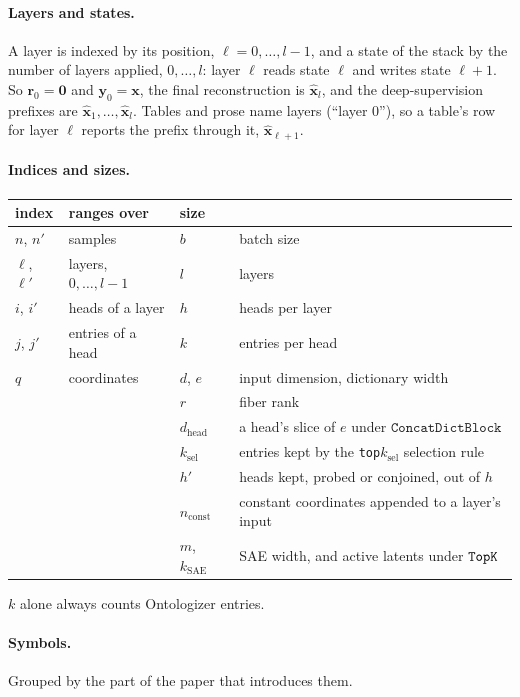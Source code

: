 \paragraph{Layers and states.}
A layer is indexed by its position, $\ell = 0,\dots,l-1$, and a state of
the stack by the number of layers applied, $0,\dots,l$: layer $\ell$
reads state $\ell$ and writes state $\ell+1$. So $\mathbf{r}_0 =
\mathbf{0}$ and $\mathbf{y}_0 = \mathbf{x}$, the final reconstruction is
$\hat{\mathbf{x}}_l$, and the deep-supervision prefixes are
$\hat{\mathbf{x}}_1,\dots,\hat{\mathbf{x}}_l$. Tables and prose name
layers (``layer 0''), so a table's row for layer $\ell$ reports the prefix
through it, $\hat{\mathbf{x}}_{\ell+1}$.

\paragraph{Indices and sizes.}
\begin{center}\small
\begin{tabular}{@{}llll@{}}
\toprule
index & ranges over & size & \\
\midrule
$n$, $n'$ & samples & $b$ & batch size \\
$\ell$, $\ell'$ & layers, $0,\dots,l-1$ & $l$ & layers \\
$i$, $i'$ & heads of a layer & $h$ & heads per layer \\
$j$, $j'$ & entries of a head & $k$ & entries per head \\
$q$ & coordinates & $d$, $e$ & input dimension, dictionary width \\
\midrule
& & $r$ & fiber rank \\
& & $d_{\mathrm{head}}$ & a head's slice of $e$ under $\mathtt{ConcatDictBlock}$ \\
& & $k_{\mathrm{sel}}$ & entries kept by the \texttt{top}$k_{\mathrm{sel}}$ selection rule \\
& & $h'$ & heads kept, probed or conjoined, out of $h$ \\
& & $n_{\mathrm{const}}$ & constant coordinates appended to a layer's input \\
& & $m$, $k_{\mathrm{SAE}}$ & SAE width, and active latents under $\mathop{\mathtt{TopK}}\limits$ \\
\bottomrule
\end{tabular}
\end{center}
$k$ alone always counts Ontologizer entries.

\paragraph{Symbols.}
Grouped by the part of the paper that introduces them.

